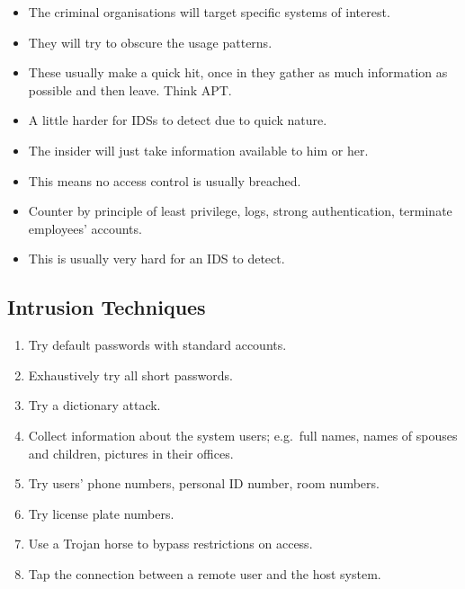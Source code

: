 \begin{frame}
  \begin{itemize}
    \item The criminal organisations will target specific systems of interest.

    \item They will try to obscure the usage patterns.

    \item These usually make a quick hit, once in they gather as much 
      information as possible and then leave.
      Think APT.

    \item A little harder for IDSs to detect due to quick nature.
  \end{itemize}
\end{frame}

\begin{frame}
  \begin{itemize}
    \item The insider will just take information available to him or her.

    \item This means no access control is usually breached.

    \item Counter by principle of least privilege, logs, strong authentication, 
      terminate employees' accounts.

    \item This is usually very hard for an IDS to detect.
  \end{itemize}
\end{frame}

\subsection{Intrusion Techniques}

\begin{frame}
  \begin{enumerate}
    \item Try default passwords with standard accounts.
    \item Exhaustively try all short passwords.
    \item Try a dictionary attack.
    \item Collect information about the system users; e.g.\ full names, names 
      of spouses and children, pictures in their offices.
    \item Try users' phone numbers, personal ID number, room numbers.
    \item Try license plate numbers.
    \item Use a Trojan horse to bypass restrictions on access.
    \item Tap the connection between a remote user and the host system.
  \end{enumerate}
\end{frame}


